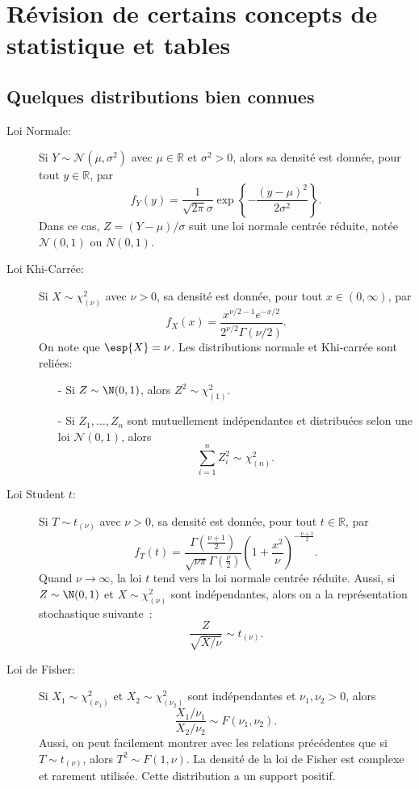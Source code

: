 \chapter{Révision de certains concepts de statistique et tables}
\label{chap:tables}

\section{Quelques distributions bien connues}

\begin{description}
\item[Loi Normale:] Si $Y\sim \mathcal{N}(\mu, \sigma^2)$ avec $\mu \in\mathbb{R}$ et $\sigma^2>0$, alors sa densité est donnée, pour tout $y\in\mathbb{R}$, par
$$
f_{Y}(y)=\frac{1}{\sqrt{2\pi}\sigma}\exp\left\{-\frac{(y-\mu)^2}{2\sigma^2}\right\}.
$$ 
Dans ce cas, $Z=(Y-\mu)/\sigma$ suit une loi normale centrée réduite, notée $\mathcal{N}(0,1)$ ou $N(0,1)$. 

\bigskip

\item[Loi Khi-Carrée:] Si $X\sim \chi^{2}_{(\nu)}$ avec $\nu>0$, sa densité est donnée, pour tout $x \in (0,\infty)$, par
$$
f_{X}(x)=\frac{x^{\nu/2-1}e^{-x/2}}{2^{\nu/2}\Gamma(\nu/2)}.
$$
On note que $\esp{X}=\nu$. Les distributions normale et Khi-carrée sont reliées:

\begin{itemize}
\item [-]
Si $Z\sim \N(0,1)$, alors $Z^2\sim \chi^{2}_{(1)}$. 

\item[-]
Si $Z_1,\ldots,Z_n$ sont mutuellement indépendantes et distribuées selon une loi $\mathcal{N}(0,1)$, alors 
$$
\sum_{i=1}^{n}Z_i^2\sim \chi^2_{(n)}.
$$

\end{itemize}

\bigskip
\item[Loi Student $t$:] Si $T\sim t_{(\nu)}$ avec $\nu>0$, sa densité est donnée, pour tout $t\in\mathbb{R}$, par
$$
f_T(t)=\frac{\Gamma\left(\frac{\nu+1}{2}\right)}{\sqrt{\nu\pi}\Gamma\left(\frac{\nu}{2}\right)}\left(1+\frac{x^2}{\nu}\right)^{-\frac{\nu+1}{2}}.
$$ 
Quand $\nu\rightarrow\infty$, la loi $t$ tend vers la loi normale centrée réduite. Aussi, si $Z\sim \N(0,1)$ et $X\sim \chi^{2}_{(\nu)}$ sont indépendantes, alors on a la représentation stochastique suivante~:
$$
\frac{Z}{\sqrt{X/\nu}}\sim t_{(\nu)}.
$$

\bigskip
\item[Loi de Fisher:] Si $X_1\sim \chi^{2}_{(\nu_1)}$ et $X_2\sim \chi^{2}_{(\nu_2)}$ sont indépendantes et $\nu_1,\nu_2>0$, alors 
$$
\frac{X_1/\nu_1}{X_2/\nu_2}\sim F(\nu_1,\nu_2).
$$ 
Aussi, on peut facilement montrer avec les relations précédentes que si $T\sim t_{(\nu)}$, alors $T^{2}\sim F(1, \nu).$ La densité de la loi de Fisher est complexe et rarement utilisée. Cette distribution a un support positif.
\end{description}

